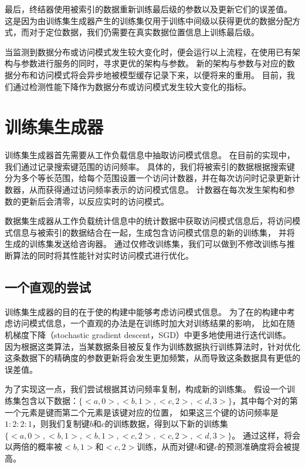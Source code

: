 最后，终结器使用被索引的数据重新训练{\rmi}最后级{\model}的参数以及更新它们的误差值。
这是因为由训练集生成器产生的训练集仅用于训练中间级{\model}以获得更优的数据分配方式，而对于定位数据，我们仍需要在真实数据位置信息上训练最后级{\model}。

当{\sys}监测到数据分布或访问模式发生较大变化时，便会运行以上流程，在使用已有{\rmi}架构与参数进行服务的同时，寻求更优的{\rmi}架构与参数。
新的{\rmi}架构与参数与对应的数据分布和访问模式将会异步地被模型缓存记录下来，以便将来的重用。
目前，我们通过检测{\li}性能下降作为数据分布或访问模式发生较大变化的指标。

\section{训练集生成器}

训练集生成器首先需要从工作负载信息中抽取访问模式信息。
在目前的实现中，我们通过记录搜索键范围的访问频率。
具体的，我们将被索引的数据根据搜索键分为多个等长范围，给每个范围设置一个访问计数器，并在每次访问时记录更新计数器，从而获得通过访问频率表示的访问模式信息。
计数器在每次发生{\rmi}架构和参数的更新后会清零，以反应实时的访问模式。

数据集生成器从工作负载统计信息中的统计数据中获取访问模式信息后，将访问模式信息与被索引的数据结合在一起，生成包含访问模式信息的新的训练集，
并将生成的训练集发送给咨询器。
通过仅修改训练集，我们可以做到不修改{\rmi}训练与推断算法的同时将其性能针对实时访问模式进行优化。


\subsection{一个直观的尝试}
\label{sec:pattern-intuitive}

训练集生成器的目的在于使{\li}的构建中能够考虑访问模式信息。
为了在{\li}的构建中考虑访问模式信息，一个直观的办法是在训练时加大{\hotkey}对训练结果的影响，
比如在随机梯度下降（stochastic gradient descent，SGD）中更多地使用{\hotkey}进行迭代训练。
因为根据这类算法，当某数据条目被反复作为训练数据执行训练算法时，针对优化这条数据下的精确度的参数更新将会发生更加频繁，从而导致这条数据具有更低的误差值。

为了实现这一点，我们尝试根据其访问频率复制{\hotkey}，构成新的训练集。
假设一个训练集包含以下数据：$\{<a, 0>, <b, 1>, <c, 2>, <d, 3>\}$，其中每个对的第一个元素是键而第二个元素是该键对应的位置，
如果这三个键的访问频率是$1:2:2:1$，则我们复制键$b$和$c$的训练数据，得到以下新的训练集$\{<a, 0>, <b, 1>, <b, 1>, <c, 2>, <c, 2>, <d, 3>\}$。
通过这样，{\model}将会以两倍的概率被$<b, 1>$和$<c, 2>$训练，从而对键$b$和键$c$的预测准确度将会被提高。


